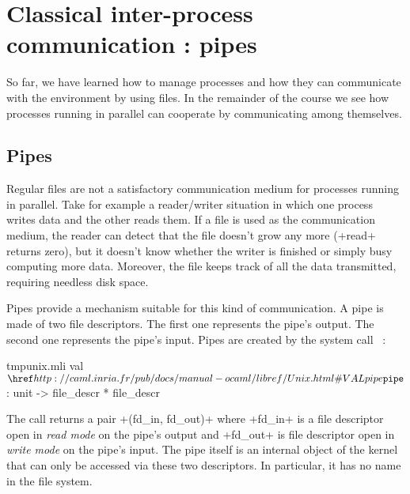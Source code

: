 %
%

\chapter{Classical inter-process communication : pipes}

\label{sec/pipes}

So far, we have learned how to manage processes and how they can communicate
with the environment by using files. In the remainder of the
course we see how processes running in parallel can cooperate by
communicating among themselves.

\section{Pipes}

Regular files are not a satisfactory communication medium for processes
running in parallel. Take for example a reader/writer situation in
which one process writes data and the other reads them. If a file is used
as the communication medium, the reader can detect that the file
doesn't grow any more (\ml+read+ returns zero), but it doesn't know
whether the writer is finished or simply busy computing
more data. Moreover, the file keeps track of all the data transmitted,
requiring needless disk space.

Pipes provide a mechanism suitable for this kind of communication. A
pipe is made of two file descriptors. The first one
represents the pipe's output. The second one represents
the pipe's input. Pipes are created by the system call
~:
%
\begin{listingcodefile}{tmpunix.mli}
val $\libvalue{Unix}{pipe}$ : unit -> file_descr * file_descr
\end{listingcodefile}
%
The call returns a pair \ml+(fd_in, fd_out)+ where \ml+fd_in+ is a
file descriptor open in \emph{read mode} on the pipe's output and
\ml+fd_out+ is file descriptor open in \emph{write mode} on the pipe's
input. The pipe itself is an internal object of the kernel that can
only be accessed via these two descriptors. In particular, it has no
name in the file system.

